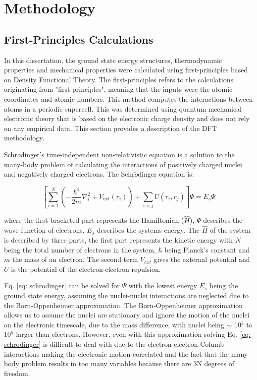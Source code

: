 \chapter{Methodology}

\section{First-Principles Calculations}

In this dissertation, the ground state energy structures, thermodynamic properties and mechanical properties were calculated using first-principles based on Density Functional Theory. The first-principles refers to the calculations originating from "first-principles", meaning that the inputs were the atomic coordinates and atomic numbers. This method computes the interactions between atoms in a periodic supercell. This was determined using quantum mechanical electronic theory that is based on the electronic charge density and does not rely on any empirical data. This section provides a description of the DFT methodology.

Schr$\ddot{o}$dinger's time-independent non-relativistic equation is a solution to the many-body problem of calculating the interactions of positively charged nuclei and negatively charged electrons. The Schr$\ddot{o}$dinger equation is:

\begin{equation}
\label{eq: schrodinger}
\left[ \sum_{i=1}^{N} \left( - \frac{\hbar^2}{2m} \nabla_{i}^2 + V_{ext} (r_{i}) \right) + \sum_{i<j} U (r_{i}, r_{j}) \right] \Psi = E_{s} \Psi
\end{equation}

\noindent where the first bracketed part represents the Hamiltonian ($\hat{H}$), $\Psi$ describes the wave function of electrons, $E_{s}$ describes the systems energy. The $\hat{H}$ of the system is described by three parts, the first part represents the kinetic energy with $N$ being the total number of electrons in the system, $\hbar$ being Planck's constant and $m$ the mass of an electron. The second term $V_{ext}$ gives the external potential and $U$ is the potential of the electron-electron repulsion.

Eq. \ref{eq: schrodinger} can be solved for $\Psi$ with the lowest energy $E_s$ being the ground state energy, assuming the nuclei-nuclei interactions are neglected due to the Born-Oppenheimer approximation. The Born-Oppenheimer approximation allows us to assume the nuclei are stationary and ignore the motion of the nuclei on the electronic timescale, due to the mass difference, with nuclei being $\sim$ 10$^3$ to 10$^5$ larger than electrons. However, even with this approximation solving Eq. \ref{eq: schrodinger} is difficult to deal with due to the electron-electron Columb interactions making the electronic motion correlated and the fact that the many-body problem results in too many variables because there are 3N degrees of freedom. 

